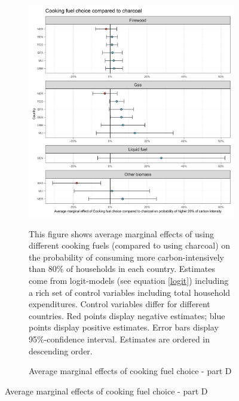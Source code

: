  \begin{figure}[ht!]\ContinuedFloat
   \centering
   \begin{subfigure}[b]{\textwidth}
   \centering
   \caption{Average marginal effects of cooking fuel choice - part D} \label{fig:Logit_ME_CF_4}
   \includegraphics{1_Figures/Analysis_Logit_Models_Marginal_Effects/Average_Marginal_Effects_affected_upper_80_CF_Charcoal_2017.jpg}
   \begin{subcaption2}
     This figure shows average marginal effects of using different cooking fuels (compared to using charcoal) on the probability of consuming more carbon-intensively than 80\% of households in each country. Estimates come from logit-models (see equation \ref{logit}) including a rich set of control variables including total household expenditures. Control variables differ for different countries. Red points display negative estimates; blue points display positive estimates. Error bars display 95\%-confidence interval. Estimates are ordered in descending order.
   \end{subcaption2}
   \end{subfigure}
 \end{figure}
 \clearpage
